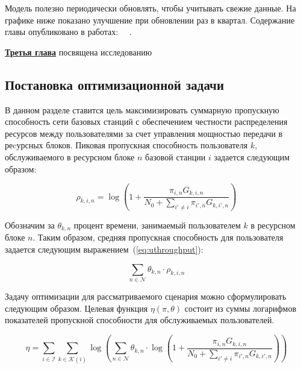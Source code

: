 Модель полезно периодически обновлять, чтобы учитывать свежие данные. На графике ниже показано улучшение при обновлении раз в квартал.
Содержание главы опубликовано в работах:~\cite{itivs-2017} ~\cite{bulletin-rzd}.


\underline{\textbf{Третья глава}} посвящена исследованию
\subsection{Постановка оптимизационной задачи}
В данном разделе ставится цель максимизировать суммарную пропускную способность сети базовых станций с обеспечением честности распределения ресурсов между пользователями за счет управления мощностью передачи в реcурсных блоков. Пиковая пропускная способность пользователя $k$, обслуживаемого в ресурсном блоке $n$ базовой станции $i$ задается следующим образом:

\begin{equation}
    \label{eq:throughput}
    \rho_{k,i,n} = \log \left(1 + \frac{\pi_{i,n} G_{k,i,n}}{N_0 + \sum_{i'\neq i}{\pi_{i',n} G_{k,i',n}}}\right)
\end{equation}

Обозначим за $\theta_{k,n}$ процент времени, занимаемый пользователем $k$ в ресурсном блоке $n$. Таким образом, средняя пропускная способность для пользователя задается следующим выражением~(\ref{eq:uthroughput}):

\begin{equation}
    \label{eq:uthroughput}
    \sum_{n \in \mathcal{N}} \theta_{k,n} \cdot \rho_{k,i,n}
\end{equation}

Задачу оптимизации для рассматриваемого сценария можно сформулировать следующим образом. Целевая функция $\eta(\pi, \theta)$ состоит из суммы логарифмов показателей пропускной способности для обслуживаемых пользователей.

\begin{equation}
\label{eq:maximize}
\eta = \sum_{i \in \mathcal{I}} \sum_{k \in \mathcal{K}(i)} \log \left(\sum_{n \in \mathcal{N}} \theta_{k,n} \cdot \log \left(1 + \frac{\pi_{i,n} G_{k,i,n}}{N_0 + \sum_{i'\neq i}{\pi_{i',n} G_{k,i',n}}}\right)\right)
\end{equation}

